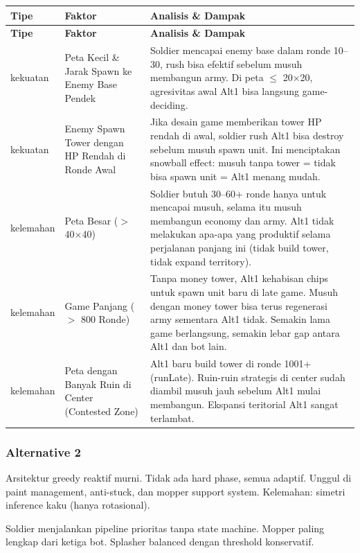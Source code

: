 \documentclass{article}
\begin{document}
\begin{enumerate}[label=\alph*.]
\begin{longtable}{|p{2cm}|p{3.5cm}|p{8.5cm}|}
\hline
\textbf{Tipe} & \textbf{Faktor} & \textbf{Analisis \& Dampak} \\
\hline
\endfirsthead
\hline
\textbf{Tipe} & \textbf{Faktor} & \textbf{Analisis \& Dampak} \\
\hline
\endhead
\hline
\endfoot
kekuatan
& Peta Kecil \& Jarak Spawn ke Enemy Base Pendek
& Soldier mencapai enemy base dalam ronde 10--30, rush bisa efektif sebelum musuh membangun army.
Di peta $\leq$ 20$\times$20, agresivitas awal Alt1 bisa langsung game-deciding. \\
\hline
kekuatan
& Enemy Spawn Tower dengan HP Rendah di Ronde Awal
& Jika desain game memberikan tower HP rendah di awal, soldier rush Alt1 bisa destroy sebelum musuh spawn unit.
Ini menciptakan snowball effect: musuh tanpa tower = tidak bisa spawn unit = Alt1 menang mudah. \\
\hline
kelemahan
& Peta Besar ($>$ 40$\times$40)
& Soldier butuh 30--60+ ronde hanya untuk mencapai musuh, selama itu musuh membangun economy dan army.
Alt1 tidak melakukan apa-apa yang produktif selama perjalanan panjang ini (tidak build tower, tidak expand territory). \\
\hline
kelemahan
& Game Panjang ($>$ 800 Ronde)
& Tanpa money tower, Alt1 kehabisan chips untuk spawn unit baru di late game.
Musuh dengan money tower bisa terus regenerasi army sementara Alt1 tidak.
Semakin lama game berlangsung, semakin lebar gap antara Alt1 dan bot lain. \\
\hline
kelemahan
& Peta dengan Banyak Ruin di Center (Contested Zone)
& Alt1 baru build tower di ronde 1001+ (runLate).
Ruin-ruin strategis di center sudah diambil musuh jauh sebelum Alt1 mulai membangun.
Ekspansi teritorial Alt1 sangat terlambat. \\
\hline
\end{longtable}

\subsubsection{Alternative 2}

Arsitektur greedy reaktif murni. Tidak ada hard phase, semua adaptif. Unggul di paint
management, anti-stuck, dan mopper support system. Kelemahan: simetri inference kaku
(hanya rotasional).


Soldier menjalankan pipeline prioritas tanpa state machine. Mopper paling lengkap dari ketiga bot. Splasher balanced dengan threshold konservatif.


\end{enumerate}
\end{document}
